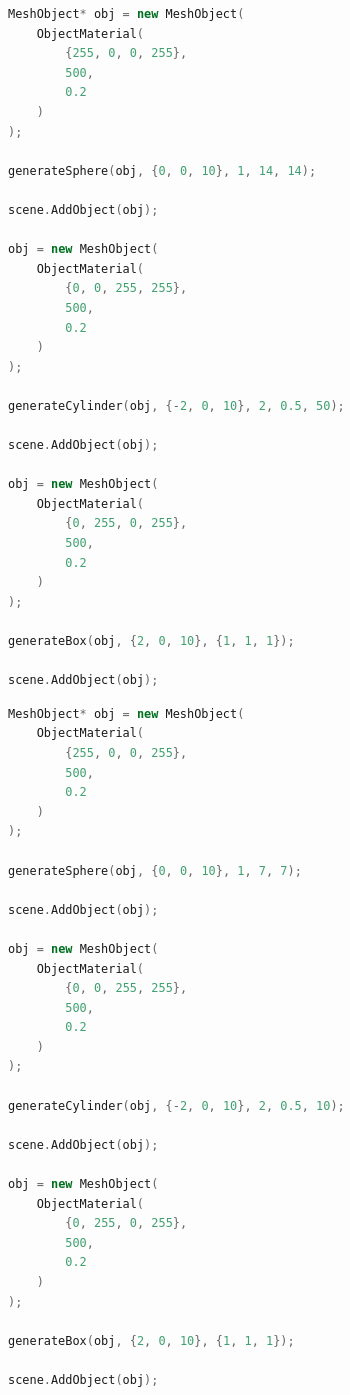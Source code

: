 \documentclass[12pt, a4paper]{article}
\begin{document}
\begin{lstlisting}[language=C++,caption={Test \#7 Lowres Mesh}]
MeshObject* obj = new MeshObject(
	ObjectMaterial(
		{255, 0, 0, 255},
		500,
		0.2
	)
);

generateSphere(obj, {0, 0, 10}, 1, 14, 14);

scene.AddObject(obj);

obj = new MeshObject(
	ObjectMaterial(
		{0, 0, 255, 255},
		500,
		0.2
	)
);

generateCylinder(obj, {-2, 0, 10}, 2, 0.5, 50);

scene.AddObject(obj);

obj = new MeshObject(
	ObjectMaterial(
		{0, 255, 0, 255},
		500,
		0.2
	)
);

generateBox(obj, {2, 0, 10}, {1, 1, 1});

scene.AddObject(obj);
\end{lstlisting}

\begin{lstlisting}[language=C++,caption={Test \#7 Highres Mesh}]
MeshObject* obj = new MeshObject(
	ObjectMaterial(
		{255, 0, 0, 255},
		500,
		0.2
	)
);

generateSphere(obj, {0, 0, 10}, 1, 7, 7);

scene.AddObject(obj);

obj = new MeshObject(
	ObjectMaterial(
		{0, 0, 255, 255},
		500,
		0.2
	)
);

generateCylinder(obj, {-2, 0, 10}, 2, 0.5, 10);

scene.AddObject(obj);

obj = new MeshObject(
	ObjectMaterial(
		{0, 255, 0, 255},
		500,
		0.2
	)
);

generateBox(obj, {2, 0, 10}, {1, 1, 1});

scene.AddObject(obj);
\end{lstlisting}

\clearpage
\end{document}
